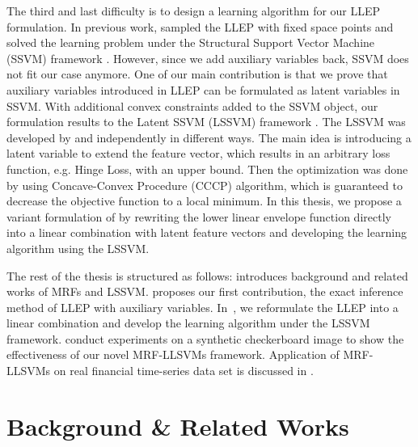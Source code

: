 The third and last difficulty is to design a learning algorithm
for our LLEP formulation. In previous work,
 sampled the LLEP with fixed space points
and solved the learning problem under the Structural Support
Vector Machine (SSVM) framework \cite{tsochantaridis2005large}.
However, since we add auxiliary variables back, SSVM does not fit
our case anymore. One of our main contribution is that we prove
that auxiliary variables introduced in LLEP can be formulated as
latent variables in SSVM. With additional convex constraints
added to the SSVM object, our formulation results to the Latent
SSVM (LSSVM) framework \cite{yu2009learning}. The LSSVM was
developed by  and
 independently in different ways. The
main idea is introducing a latent variable to extend the feature
vector, which results in an arbitrary loss function, e.g. Hinge
Loss, with an upper bound. Then the optimization was done by
using Concave-Convex Procedure (CCCP) algorithm, which is
guaranteed to decrease the objective function to a local minimum.
In this thesis, we propose a variant formulation of
\cite{gouldlearning} by rewriting the lower linear envelope
function directly into a linear combination with latent feature
vectors and developing the learning algorithm using the LSSVM.

The rest of the thesis is structured as follows:
 introduces background and related works
of MRFs and LSSVM.  proposes our first
contribution, the exact inference method of LLEP with auxiliary
variables. In~, we reformulate the LLEP into
a linear combination and develop the learning algorithm under the
LSSVM framework.  conduct experiments on
a synthetic checkerboard image to show the effectiveness of our
novel MRF-LLSVMs framework. Application of MRF-LLSVMs on real
financial time-series data set is discussed in
.

\section{Background \& Related Works}
\label{sec:RelatedWorks}

